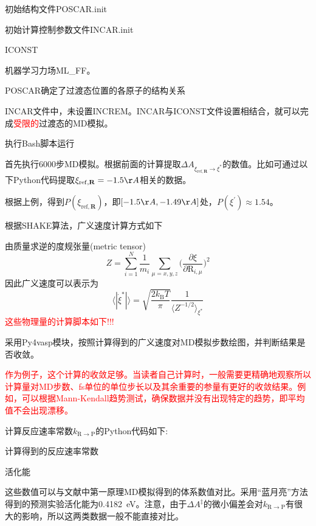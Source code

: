初始结构文件\textrm{POSCAR.init}

初始计算控制参数文件\textrm{INCAR.init}

\textrm{ICONST}

机器学习力场\textrm{ML\_FF}。

\textrm{POSCAR}确定了过渡态位置的各原子的结构关系

\textrm{INCAR}文件中，未设置\textrm{INCREM}。\textrm{INCAR}与\textrm{ICONST}文件设置相结合，就可以完成\textcolor{red}{受限的}过渡态的\textrm{MD}模拟。

执行\textrm{Bash}脚本运行

首先执行6000步\textrm{MD}模拟。根据前面的计算提取$\Delta A_{\xi_{\mathrm{ref},\mathbf{R}}\rightarrow\xi^{\ast}}$的数值。比如可通过以下\textrm{Python}代码提取$\xi_{\mathrm{ref},\mathbf{R}}=-1.5\AA$相关的数据。

根据上例，得到$P(\xi_{\mathrm{ref},\mathbf{R}})$，即$[-1.5\AA,-1.49\AA]$处，$P(\xi^{\prime})\approx1.54$。

根据\textrm{SHAKE}算法，广义速度计算方式如下

由质量求逆的度规张量\textrm{(metric tensor)}
\begin{displaymath}
	Z=\sum_{i=1}^N\dfrac1{m_i}\sum_{\mu=x,y,z}\bigg(\dfrac{\partial\xi}{\partial\mathrm{R}_{i,\mu}}\bigg)^2
\end{displaymath}
因此广义速度可以表示为
\begin{displaymath}
	\langle|\dot{\xi}^{\ast}|\rangle=\sqrt{\dfrac{2k_{\mathrm{B}}T}{\pi}}\dfrac1{\langle Z^{-1/2}\rangle_{\xi^{\ast}}}
\end{displaymath}
\textcolor{red}{这些物理量的计算脚本如下!!!}

采用\textrm{Py4vasp}模块，按照计算得到的广义速度对\textrm{MD}模拟步数绘图，并判断结果是否收敛。

\textcolor{red}{作为例子，这个计算的收敛足够。当读者自己计算时，一般需要更精确地观察所以计算量对\textrm{MD}步数、\textrm{fs}单位的单位步长以及其余重要的参量有更好的收敛结果。例如，可以根据\textrm{Mann-Kendall}趋势测试，确保数据并没有出现特定的趋势，即平均值不会出现漂移。}

计算反应速率常数$k_{\mathrm{R}\rightarrow\mathrm{P}}$的\textrm{Python}代码如下:

计算得到的反应速率常数

活化能

这些数值可以与文献中第一原理\textrm{MD}模拟得到的体系数值对比。采用``蓝月亮''方法得到的预测实验活化能为0.4182~\textrm{eV}。注意，由于$\Delta A^{\ddagger}$的微小偏差会对$k_{\mathrm{R}\rightarrow\mathrm{P}}$有很大的影响，所以这两类数据一般不能直接对比。

